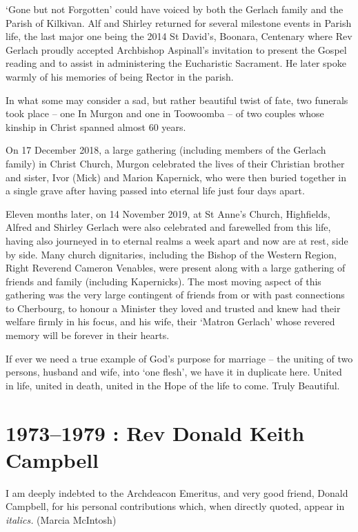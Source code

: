 `Gone but not Forgotten' could have voiced by both the Gerlach family
and the Parish of Kilkivan. Alf and Shirley returned for several
milestone events in Parish life, the last major one being the 2014 St
David's, Boonara, Centenary where Rev Gerlach proudly accepted
Archbishop Aspinall's invitation to present the Gospel reading and to
assist in administering the Eucharistic Sacrament. He later spoke warmly
of his memories of being Rector in the parish.

In what some may consider a sad, but rather beautiful twist of fate, two
funerals took place -- one In Murgon and one in Toowoomba -- of two
couples whose kinship in Christ spanned almost 60 years.

On 17 December 2018, a large gathering (including members of the Gerlach
family) in Christ Church, Murgon celebrated the lives of their Christian
brother and sister, Ivor (Mick) and Marion Kapernick, who were then
buried together in a single grave after having passed into eternal life
just four days apart.

Eleven months later, on 14 November 2019, at St Anne's Church,
Highfields, Alfred and Shirley Gerlach were also celebrated and
farewelled from this life, having also journeyed in to eternal realms a
week apart and now are at rest, side by side. Many church dignitaries,
including the Bishop of the Western Region, Right Reverend Cameron
Venables, were present along with a large gathering of friends and
family (including Kapernicks). The most moving aspect of this gathering
was the very large contingent of friends from or with past connections
to Cherbourg, to honour a Minister they loved and trusted and knew had
their welfare firmly in his focus, and his wife, their `Matron Gerlach'
whose revered memory will be forever in their hearts.

If ever we need a true example of God's purpose for marriage -- the
uniting of two persons, husband and wife, into `one flesh', we have it
in duplicate here. United in life, united in death, united in the Hope
of the life to come. Truly Beautiful.

\printendnotes[custom]
\setcounter{endnote}{0}
\chapter{1973--1979 : Rev Donald Keith
Campbell}

I am deeply indebted to the Archdeacon Emeritus, and very good friend,
Donald Campbell, for his personal contributions which, when directly
quoted, appear in \emph{italics.} (Marcia McIntosh)

